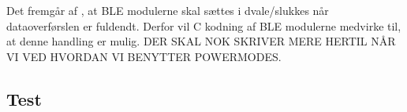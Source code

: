 Det fremgår af , at BLE modulerne skal sættes i dvale/slukkes når dataoverførslen er fuldendt. Derfor vil C kodning af BLE modulerne medvirke til, at denne handling er mulig. DER SKAL NOK SKRIVER MERE HERTIL NÅR VI VED HVORDAN VI BENYTTER POWERMODES.


\subsection{Test}
